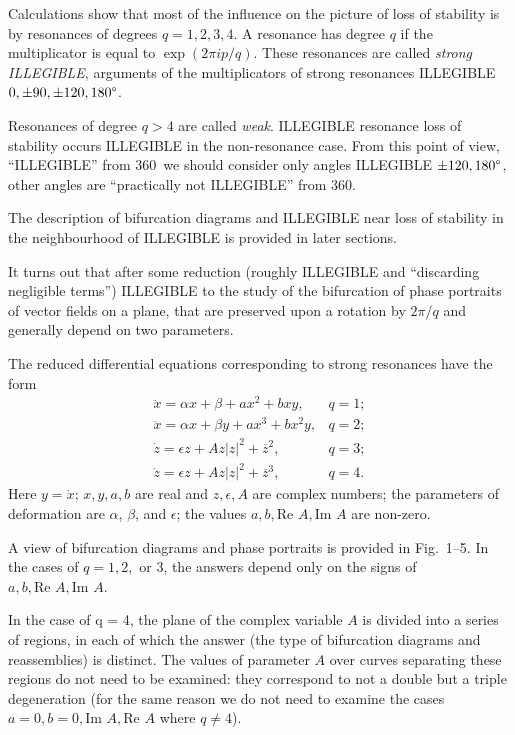 \documentclass[12pt]{amsart}
\begin{document}
Calculations show that most of the influence on the picture of loss of stability
is by resonances of degrees $q=1,2,3,4$. A resonance has degree $q$ if the
multiplicator is equal to $\exp(2\pi ip/q)$.
These resonances are called \textit{strong ILLEGIBLE}, arguments of the
multiplicators of strong resonances ILLEGIBLE $0,\pm90,\pm120,180\degree$.

Resonances of degree $q>4$ are called \textit{weak}.
ILLEGIBLE resonance loss of stability occurs ILLEGIBLE in the non-resonance
case.
From this point of view, ``ILLEGIBLE'' from 360\degree~we should consider only
angles ILLEGIBLE $\pm120,180\degree$, other angles are ``practically not
ILLEGIBLE'' from 360\degree.

The description of bifurcation diagrams and ILLEGIBLE near loss of stability in
the neighbourhood of ILLEGIBLE is provided in later sections.

It turns out that after some reduction (roughly ILLEGIBLE and ``discarding
negligible terms'') ILLEGIBLE to the study of the bifurcation of phase portraits
of vector fields on a plane, that are preserved upon a rotation by $2\pi/q$
and generally depend on two parameters.

The reduced differential equations corresponding to strong resonances have the
form
$$\begin{array}{ll}
\ddot x=\alpha x+\beta+ax^2+bxy,&q=1;\\
\ddot x=\alpha x+\beta y+ax^3+bx^2y,&q=2;\\
\dot z=\epsilon z+Az|z|^2+\overline z^2,&q=3;\\
\dot z=\epsilon z+Az|z|^2+\overline z^3,&q=4.
\end{array}$$
Here $y=\dot x$; $x,y,a,b$ are real and $z,\epsilon,A$ are complex numbers;
the parameters of deformation are $\alpha$, $\beta$, and $\epsilon$; the values
$a,b,\text{Re }A,\text{Im }A$ are non-zero.

A view of bifurcation diagrams and phase portraits is provided in Fig.~1--5.
In the cases of $q=1,2,$ or $3$, the answers depend only on the signs of
$a,b,\text{Re }A,\text{Im }A$.

In the case of q = 4, the plane of the complex variable $A$ is divided into a
series of regions, in each of which the answer (the type of bifurcation diagrams
and reassemblies) is distinct.
The values of parameter $A$ over curves separating these regions do not need to
be examined: they correspond to not a double but a triple degeneration (for the
same reason we do not need to examine the cases
$a=0,b=0,\text{Im }A,\text{Re }A$ where $q\neq4$).
\end{document}
